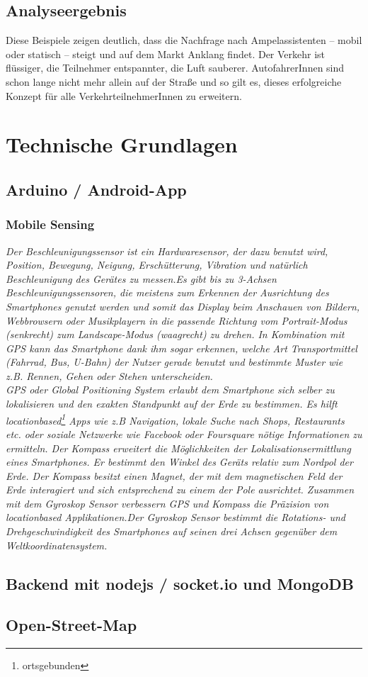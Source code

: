\subsection{Analyseergebnis}
Diese Beispiele zeigen deutlich, dass die Nachfrage nach Ampelassistenten -- mobil oder statisch -- steigt und auf dem Markt Anklang findet. Der Verkehr ist flüssiger, die Teilnehmer entspannter, die Luft sauberer. AutofahrerInnen sind schon lange nicht mehr allein auf der Straße und so gilt es, dieses erfolgreiche Konzept für alle VerkehrteilnehmerInnen zu erweitern.
\section{Technische Grundlagen}
\subsection{Arduino / Android-App}
\subsubsection{Mobile Sensing}
\textit{Der Beschleunigungssensor ist ein Hardwaresensor, der dazu benutzt wird, Position, Bewegung, Neigung, Erschütterung, Vibration und natürlich Beschleunigung des Gerätes zu messen.Es gibt bis zu 3-Achsen Beschleunigungssensoren, die meistens zum Erkennen der Ausrichtung des Smartphones genutzt werden und somit das Display beim Anschauen von Bildern, Webbrowsern oder Musikplayern in die passende Richtung vom Portrait-Modus (senkrecht) zum Landscape-Modus (waagrecht) zu drehen. In Kombination mit \gls{GPS} kann das Smartphone dank ihm sogar erkennen, welche Art Transportmittel (Fahrrad, Bus, U-Bahn) der Nutzer gerade benutzt und bestimmte Muster wie z.B. Rennen, Gehen oder Stehen unterscheiden.\\
GPS oder Global Positioning System erlaubt dem Smartphone sich selber zu lokalisieren und den exakten Standpunkt auf der Erde zu bestimmen. Es hilft locationbased\footnote{ortsgebunden} Apps wie z.B Navigation, lokale Suche nach Shops, Restaurants etc. oder soziale Netzwerke wie Facebook oder Foursquare nötige Informationen zu ermitteln. Der Kompass erweitert die Möglichkeiten der Lokalisationsermittlung eines Smartphones. Er bestimmt den Winkel des Geräts relativ zum Nordpol der Erde. Der Kompass besitzt einen Magnet, der mit dem magnetischen Feld der Erde interagiert und sich entsprechend zu einem der Pole ausrichtet. Zusammen mit dem Gyroskop Sensor verbessern GPS und Kompass die Präzision von locationbased Applikationen.Der Gyroskop Sensor bestimmt die Rotations- und Drehgeschwindigkeit des Smartphones auf seinen drei Achsen gegenüber dem Weltkoordinatensystem.}
\subsection{Backend mit nodejs / socket.io und MongoDB}
\subsection{Open-Street-Map}
